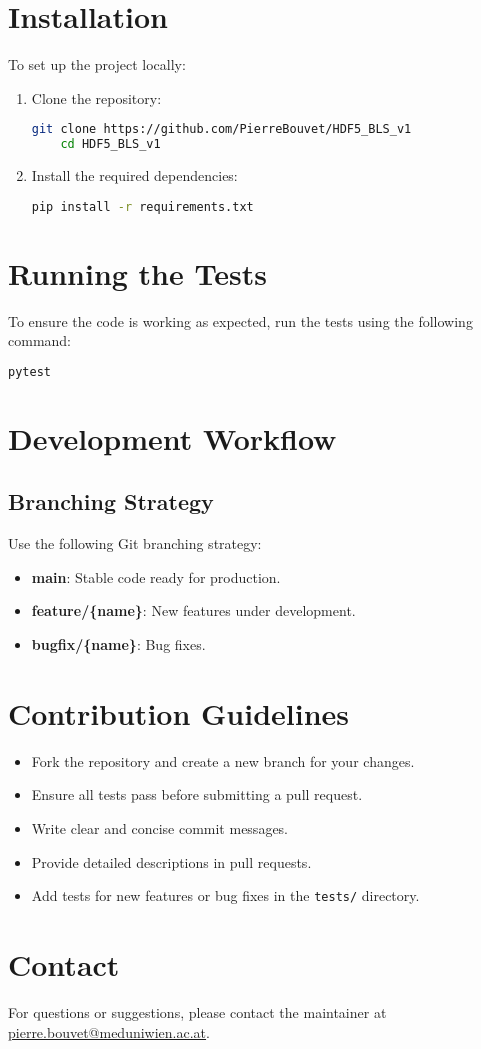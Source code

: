 \documentclass[a4paper,12pt]{article}
\begin{document}
\section{Installation}
To set up the project locally:
\begin{enumerate}
    \item Clone the repository:
    \begin{lstlisting}[language=bash]
    git clone https://github.com/PierreBouvet/HDF5_BLS_v1
    cd HDF5_BLS_v1
    \end{lstlisting}
    \item Install the required dependencies:
    \begin{lstlisting}[language=bash]
    pip install -r requirements.txt
    \end{lstlisting}
\end{enumerate}

\section{Running the Tests}
To ensure the code is working as expected, run the tests using the following command:
\begin{lstlisting}[language=bash]
pytest
\end{lstlisting}

\section{Development Workflow}
\subsection{Branching Strategy}
Use the following Git branching strategy:
\begin{itemize}
    \item \textbf{main}: Stable code ready for production.
    \item \textbf{feature/\{name\}}: New features under development.
    \item \textbf{bugfix/\{name\}}: Bug fixes.
\end{itemize}

\section{Contribution Guidelines}
\begin{itemize}
    \item Fork the repository and create a new branch for your changes.
    \item Ensure all tests pass before submitting a pull request.
    \item Write clear and concise commit messages.
    \item Provide detailed descriptions in pull requests.
    \item Add tests for new features or bug fixes in the \texttt{tests/} directory.
\end{itemize}

\section{Contact}
For questions or suggestions, please contact the maintainer at \href{mailto:pierre.bouvet@meduniwien.ac.at}{pierre.bouvet@meduniwien.ac.at}.
\end{document}
